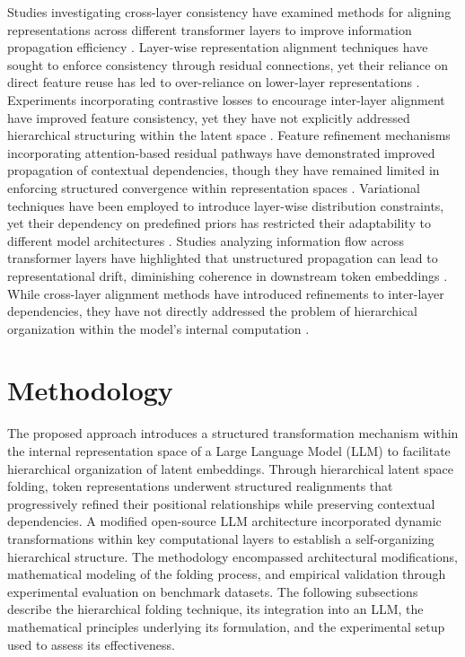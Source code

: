 \documentclass[5p,times]{elsarticle}
\begin{document}
Studies investigating cross-layer consistency have examined methods for aligning representations across different transformer layers to improve information propagation efficiency \cite{langston2024automated}. Layer-wise representation alignment techniques have sought to enforce consistency through residual connections, yet their reliance on direct feature reuse has led to over-reliance on lower-layer representations \cite{vima2024enhancing}. Experiments incorporating contrastive losses to encourage inter-layer alignment have improved feature consistency, yet they have not explicitly addressed hierarchical structuring within the latent space \cite{aguiluz2024dynamic}. Feature refinement mechanisms incorporating attention-based residual pathways have demonstrated improved propagation of contextual dependencies, though they have remained limited in enforcing structured convergence within representation spaces \cite{kingston2024adaptive}. Variational techniques have been employed to introduce layer-wise distribution constraints, yet their dependency on predefined priors has restricted their adaptability to different model architectures \cite{hubsch2024articulating}. Studies analyzing information flow across transformer layers have highlighted that unstructured propagation can lead to representational drift, diminishing coherence in downstream token embeddings \cite{forman2024dynamic}. While cross-layer alignment methods have introduced refinements to inter-layer dependencies, they have not directly addressed the problem of hierarchical organization within the model’s internal computation \cite{keith2024optimizing}.


\section{Methodology}

The proposed approach introduces a structured transformation mechanism within the internal representation space of a Large Language Model (LLM) to facilitate hierarchical organization of latent embeddings. Through hierarchical latent space folding, token representations underwent structured realignments that progressively refined their positional relationships while preserving contextual dependencies. A modified open-source LLM architecture incorporated dynamic transformations within key computational layers to establish a self-organizing hierarchical structure. The methodology encompassed architectural modifications, mathematical modeling of the folding process, and empirical validation through experimental evaluation on benchmark datasets. The following subsections describe the hierarchical folding technique, its integration into an LLM, the mathematical principles underlying its formulation, and the experimental setup used to assess its effectiveness.
\end{document}
